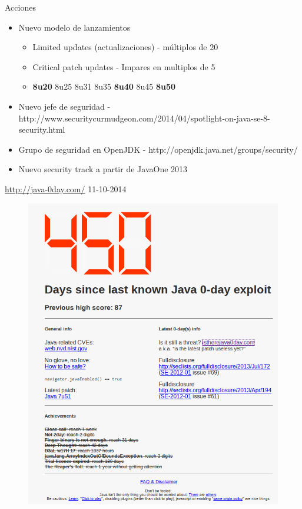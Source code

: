 \documentclass[12pt]{beamer}
\begin{document}
\begin{frame}{Acciones}
\begin{itemize}
\item Nuevo modelo de lanzamientos
	\begin{itemize}
	\item Limited updates (actualizaciones) - múltiplos de 20
	\item Critical patch updates - Impares en multiplos de 5
	\item \textbf{8u20} 8u25 8u31 8u35 \textbf{8u40} 8u45 \textbf{8u50}
	\end{itemize}
\item Nuevo jefe de seguridad - http://www.securitycurmudgeon.com/2014/04/spotlight-on-java-se-8-security.html
\item Grupo de seguridad en OpenJDK - http://openjdk.java.net/groups/security/
\item Nuevo security track a partir de JavaOne 2013
\end{itemize}
\end{frame}

\begin{frame}
\centering \url{http://java-0day.com/} 11-10-2014
\begin{figure}
\centering
\includegraphics[width=\linewidth]{Images/not5}
\end{figure}
\end{frame}
\end{document}
